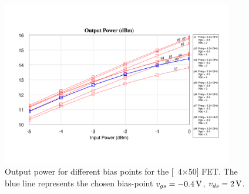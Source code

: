 			\begin{figure}[hbt!]
				\centering
				\includegraphics[trim=50 60 30 60, clip, width=0.9\textwidth]{fig/amplifiers/lo/4x50_output_power}
				\caption[Gain for different bias-points]{Output power for different bias points for the \unit[4$\times$50]{\mum} FET. The blue line represents the chosen bias-point $v_{gs}=\unit[-0.4]{V}$, $v_{ds}=\unit[2]{V}$.}\label{fig:4x50_output_power}
			\end{figure}
			





			
			
